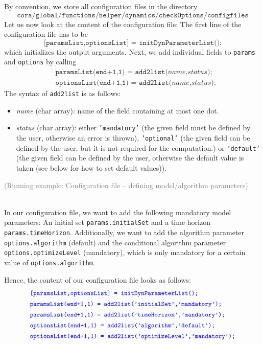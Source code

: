 By convention, we store all configuration files in the directory
\begin{equation*}
	\texttt{cora/global/functions/helper/dynamics/checkOptions/configfiles}
\end{equation*}
Let us now look at the content of the configuration file:
The first line of the configuration file has to be 
\begin{equation*}
	\texttt{[paramsList,optionsList] = initDynParameterList();}
\end{equation*}
which initializes the output arguments.
Next, we add individual fields to \texttt{params} and \texttt{options} by calling
\begin{align*}
	&\texttt{paramsList(end+1,1) = add2list(}\textit{name,status}\texttt{);} \\
	&\texttt{optionsList(end+1,1) = add2list(}\textit{name,status}\texttt{);}
\end{align*}
The syntax of \texttt{add2list} is as follows:
\begin{itemize}
	\item \textit{name} (char array):
		name of the field containing at most one dot.
	\item \textit{status} (char array): either \texttt{'mandatory'} (the given field must be defined by the user, otherwise an error is thrown),
		\texttt{'optional'} (the given field can be defined by the user, but it is not required for the computation.)
		or \texttt{'default'} (the given field can be defined by the user, otherwise the default value is taken (see below for how to set default values)).
\end{itemize}

\begin{tcolorbox}
	\begin{scriptsize} \textcolor{gray}{(Running example: Configuration file -- defining model/algorithm parameters)} \end{scriptsize} \\
	In our configuration file, we want to add the following mandatory model parameters:
	An initial set \texttt{params.initialSet} and a time horizon \texttt{params.timeHorizon}.
	Additionally, we want to add the algorithm parameter \texttt{options.algorithm} (default) and the conditional algorithm parameter \texttt{options.optimizeLevel} (mandatory), which is only mandatory for a certain value of \texttt{options.algorithm}.

	Hence, the content of our configuration file looks as follows:
	\begin{align*}
		&\textcolor{blue}{\small{\texttt{[paramsList,optionsList] = initDynParameterList();}}} \\
		&\textcolor{blue}{\small{\texttt{paramsList(end+1,1) = add2list('initialSet','mandatory');}}} \\
		&\textcolor{blue}{\small{\texttt{paramsList(end+1,1) = add2list('timeHorizon','mandatory');}}} \\
		&\textcolor{blue}{\small{\texttt{optionsList(end+1,1) = add2list('algorithm','default');}}} \\
		&\textcolor{blue}{\small{\texttt{optionsList(end+1,1) = add2list('optimizeLevel','mandatory');}}}
	\end{align*}
\end{tcolorbox}

